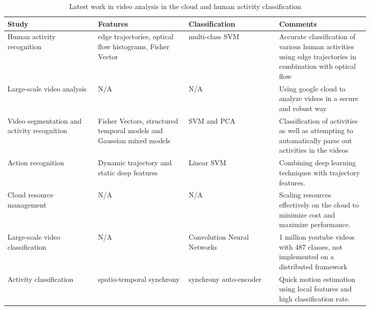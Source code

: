 \begin{singlespace}
  \begin{table}[h]
  \begin{centering}
    \begin{tabular}{ | p{0.21\linewidth} | p{0.21\linewidth} | p{0.21\linewidth} | p{0.21\linewidth}| }
    \hline
    \textbf{Study} & \textbf{Features} & \textbf{Classification} & \textbf{Comments} \\
    \hline
    Human activity recognition \cite{wang2016action}&
    edge trajectories, optical flow histograms, Fisher Vector & multi-class SVM
    & Accurate classification of various
    human activities using edge trajectories in combination with optical flow \\
    \hline
    Large-scale video analysis \cite{wang2016cloud} & N/A & N/A & Using google cloud to analyze videos in a secure and robust way \\
    \hline
    Video segmentation and activity recognition \cite{kuehne2016end} & Fisher Vectors, structured
    temporal models and Gaussian mixed models & SVM and PCA & Classification of activities as
    well as attempting to automatically parse out activities in the videos \\
    \hline
    Action recognition \cite{cai2016towards} & Dynamic trajectory and static deep features
    & Linear SVM & Combining deep learning techniques with trajectory features. \\
    \hline
    Cloud resource management \cite{kaseb2015cloud} & N/A & N/A & Scaling resources effectively
    on the cloud to minimize cost and maximize performance.\\
    \hline
    Large-scale video classification \cite{karpathy2014large} & N/A &
    Convolution Neural Networks & 1 million youtube videos with 487 classes,
    not implemented on a distributed framework \\
    \hline
    Activity classification \cite{niebles2010modeling} & spatio-temporal synchrony
    & synchrony auto-encoder & Quick motion estimation using local features
    and high classification rate. \\
    \hline
    \end{tabular}
    \caption{Latest work in video analysis in the cloud and human activity classification}
    \label{tab:paper_summary}
  \end{centering}
\end{table}
\end{singlespace}

